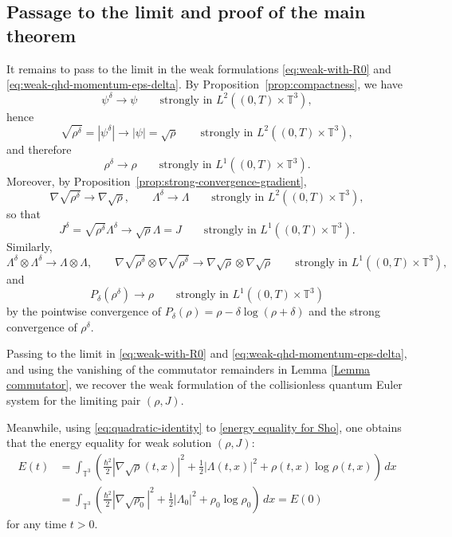 \documentclass[11pt]{article}
\begin{document}
\subsection{Passage to the limit and proof of the main theorem}

It remains to pass to the limit in the weak formulations \eqref{eq:weak-with-R0} and
\eqref{eq:weak-qhd-momentum-eps-delta}. By Proposition~\ref{prop:compactness}, we have
\[
\psi^\delta\to\psi
\qquad\text{strongly in }L^2((0,T)\times\mathbb{T}^3),
\]
hence
\[
\sqrt{\rho^\delta}=|\psi^\delta|\to|\psi|=\sqrt{\rho}
\qquad\text{strongly in }L^2((0,T)\times\mathbb{T}^3),
\]
and therefore
\[
\rho^\delta\to\rho
\qquad\text{strongly in }L^1((0,T)\times\mathbb{T}^3).
\]
Moreover, by Proposition~\ref{prop:strong-convergence-gradient},
\[
\nabla\sqrt{\rho^\delta}\to\nabla\sqrt{\rho},
\qquad
\Lambda^\delta\to\Lambda
\qquad\text{strongly in }L^2((0,T)\times\mathbb{T}^3),
\]
so that
\[
J^\delta=\sqrt{\rho^\delta}\Lambda^\delta\to \sqrt{\rho}\Lambda=J
\qquad\text{strongly in }L^1((0,T)\times\mathbb{T}^3).
\]
Similarly,
\[
\Lambda^\delta\otimes\Lambda^\delta\to \Lambda\otimes\Lambda,
\qquad
\nabla\sqrt{\rho^\delta}\otimes\nabla\sqrt{\rho^\delta}
\to
\nabla\sqrt{\rho}\otimes\nabla\sqrt{\rho}
\qquad\text{strongly in }L^1((0,T)\times\mathbb{T}^3),
\]
and
\[
P_\delta(\rho^\delta)\to \rho
\qquad\text{strongly in }L^1((0,T)\times\mathbb{T}^3)
\]
by the pointwise convergence of \(P_\delta(\rho)=\rho-\delta\log(\rho+\delta)\) and the strong convergence of \(\rho^\delta\).

Passing to the limit in \eqref{eq:weak-with-R0} and \eqref{eq:weak-qhd-momentum-eps-delta}, and using the vanishing of the commutator remainders in Lemma \ref{Lemma commutator}, we recover the weak formulation of the collisionless quantum Euler system for the limiting pair \((\rho,J)\). 



Meanwhile,  using \eqref{eq:quadratic-identity} to \eqref{energy equality for Sho}, one obtains that the energy equality for weak solution $(\rho,J)$:
\begin{equation*}
\begin{split}
E(t)
&=
\int_{\mathbb{T}^3}
\left(
\frac{\hbar^2}{2}|\nabla\sqrt{\rho}(t,x)|^2
+
\frac12 |\Lambda(t,x)|^2
+
\rho(t,x)\log \rho(t,x)
\right)\,dx
\\&=\int_{\mathbb{T}^3}
\left(
\frac{\hbar^2}{2}|\nabla\sqrt{\rho_0}|^2
+
\frac12 |\Lambda_0|^2
+
\rho_0\log \rho_0
\right)\,dx
=E(0)
\end{split}
\end{equation*}
for any time $t>0$.
\end{document}
